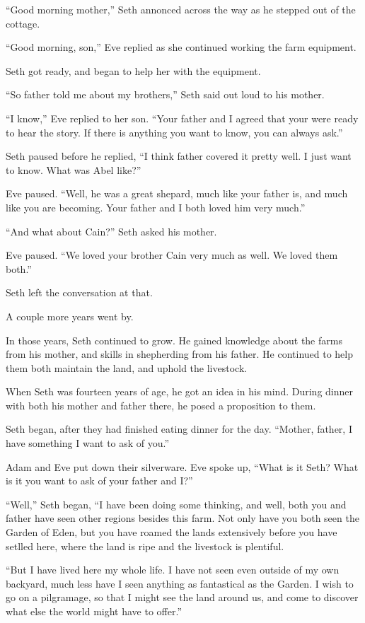 \documentclass[12pt,twoside,titlepage]{report}
\begin{document}
``Good morning mother,'' Seth annonced across the way as he stepped out
of the cottage.

``Good morning, son,'' Eve replied as she continued working the farm
equipment.

Seth got ready, and began to help her with the equipment.

``So father told me about my brothers,'' Seth said out loud to his
mother.

``I know,'' Eve replied to her son. ``Your father and I agreed that your
were ready to hear the story. If there is anything you want to know, you
can always ask.''

Seth paused before he replied, ``I think father covered it pretty well.
I just want to know. What was Abel like?''

Eve paused. ``Well, he was a great shepard, much like your father is,
and much like you are becoming. Your father and I both loved him very
much.''

``And what about Cain?'' Seth asked his mother.

Eve paused. ``We loved your brother Cain very much as well. We loved
them both.''

Seth left the conversation at that.

A couple more years went by.

In those years, Seth continued to grow. He gained knowledge about the
farms from his mother, and skills in shepherding from his father. He
continued to help them both maintain the land, and uphold the livestock.

When Seth was fourteen years of age, he got an idea in his mind. During
dinner with both his mother and father there, he posed a proposition to
them.

Seth began, after they had finished eating dinner for the day. ``Mother,
father, I have something I want to ask of you.''

Adam and Eve put down their silverware. Eve spoke up, ``What is it Seth?
What is it you want to ask of your father and I?''

``Well,'' Seth began, ``I have been doing some thinking, and well, both
you and father have seen other regions besides this farm. Not only have
you both seen the Garden of Eden, but you have roamed the lands
extensively before you have setlled here, where the land is ripe and the
livestock is plentiful.

``But I have lived here my whole life. I have not seen even outside of
my own backyard, much less have I seen anything as fantastical as the
Garden. I wish to go on a pilgramage, so that I might see the land
around us, and come to discover what else the world might have to
offer.''
\end{document}
